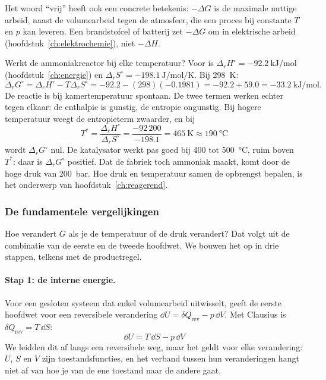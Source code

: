 Het woord ``vrij'' heeft ook een concrete betekenis: $-\Delta G$ is de maximale nuttige arbeid, naast de volumearbeid tegen de atmosfeer, die een proces bij constante $T$ en $p$ kan leveren. Een brandstofcel of batterij zet $-\Delta G$ om in elektrische arbeid (hoofdstuk~\ref{ch:elektrochemie}), niet $-\Delta H$.

\begin{voorbeeld}{Werkt de ammoniakreactor bij elke temperatuur?}
Voor  is $\Delta_r H^\circ = \SI{-92.2}{\kilo\joule\per\mole}$ (hoofdstuk~\ref{ch:energie}) en $\Delta_r S^\circ = \SI{-198.1}{\joule\per\mole\per\kelvin}$. Bij \SI{298}{\kelvin}:
\[
\Delta_r G^\circ = \Delta_r H^\circ - T\Delta_r S^\circ = -92.2 - (298)(-0.1981) = -92.2 + 59.0 = \SI{-33.2}{\kilo\joule\per\mole}.
\]
De reactie is bij kamertemperatuur spontaan. De twee termen werken echter tegen elkaar: de enthalpie is gunstig, de entropie ongunstig. Bij hogere temperatuur weegt de entropieterm zwaarder, en bij
\[
T^* = \frac{\Delta_r H^\circ}{\Delta_r S^\circ} = \frac{-92\,200}{-198.1} = \SI{465}{\kelvin} \approx \SI{190}{\celsius}
\]
wordt $\Delta_r G^\circ$ nul. De katalysator werkt pas goed bij 400 tot \SI{500}{\celsius}, ruim boven $T^*$: daar is $\Delta_r G^\circ$ positief. Dat de fabriek toch ammoniak maakt, komt door de hoge druk van \SI{200}{\bar}. Hoe druk en temperatuur samen de opbrengst bepalen, is het onderwerp van hoofdstuk~\ref{ch:reagerend}.
\end{voorbeeld}

\subsubsection{De fundamentele vergelijkingen}
\label{sec:fundamentele-vgl}

Hoe verandert $G$ als je de temperatuur of de druk verandert? Dat volgt uit de combinatie van de eerste en de tweede hoofdwet. We bouwen het op in drie stappen, telkens met de productregel.

\paragraph{Stap 1: de interne energie.} Voor een gesloten systeem dat enkel volumearbeid uitwisselt, geeft de eerste hoofdwet voor een reversibele verandering $\dd U = \delta Q_\text{rev} - p\,\dd V$. Met Clausius is $\delta Q_\text{rev} = T\,\dd S$:
\begin{equation}
\boxed{\dd U = T\,\dd S - p\,\dd V}
\label{eq:fundU}
\end{equation}
We leidden dit af langs een reversibele weg, maar het geldt voor elke verandering: $U$, $S$ en $V$ zijn toestandsfuncties, en het verband tussen hun veranderingen hangt niet af van hoe je van de ene toestand naar de andere gaat.

